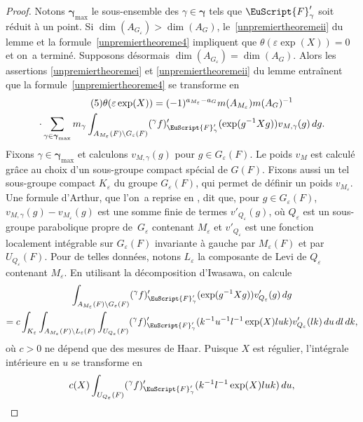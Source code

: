 \documentclass[JEP,XML,SOM,Unicode,francais]{cedram}
\let\mathcal \EuScript
\let\epsilon\varepsilon
\newcommand{\cF}{\mathcal{F}}
\theoremstyle{plain}
\theoremstyle{definition}
\begin{document}
\begin{proof}
Notons $\boldsymbol{\gamma}_{\max}$ le sous-ensemble des $\gamma\in \boldsymbol{\gamma}$ tels que $\cF'_{\gamma}$ soit réduit à un point. Si $\dim(A_{G_{\epsilon}})\!>\!\dim(A_{G})$, le~\eqref{unpremiertheoremeii} du lemme et la formule~\eqref{unpremiertheoreme4} impliquent que \hbox{$\theta(\epsilon \exp(X))\!=\!0$} et on~a terminé. Supposons désormais $\dim(A_{G_{\epsilon}})=\dim(A_{G})$. Alors les assertions \eqref{unpremiertheoremei} et \eqref{unpremiertheoremeii} du lemme entraînent que la formule~\eqref{unpremiertheoreme4} se transforme en
\begin{multline*}\tag{5}\label{unpremiertheoreme5}
\theta(\epsilon \exp(X))=(-1)^{a_{M_{\epsilon}}-a_{G}}m(A_{M_{\epsilon}})m(A_{G})^{-1}\\
\cdot\sum_{\gamma\in \boldsymbol{\gamma}_{\max}}m_{\gamma}
\int_{A_{M_{\epsilon}}(F)\backslash G_{\epsilon}(F)}(^{\gamma}f)'_{\cF'_{\gamma}}(\exp(g^{-1}X g))v_{M,\gamma} (g)\,dg.
\end{multline*}
Fixons $\gamma\in \boldsymbol{\gamma}_{\max}$ et calculons $v_{M,\gamma}(g)$ pour $g\in G_{\epsilon}(F)$. Le poids $v_{M}$ est calculé grâce au choix d'un sous-groupe compact spécial de $G(F)$. Fixons aussi un tel sous-groupe compact $K_{\epsilon}$ du groupe $G_{\epsilon}(F)$, qui permet de définir un poids $v_{M_{\epsilon}}$. Une formule d'Arthur, que l'on~a reprise en \cite[Lem.\,3.3]{W1}, dit que, pour $g\in G_{\epsilon}(F)$, $v_{M,\gamma}(g)-v_{M_{\epsilon}}(g)$ est une somme finie de termes $v'_{Q_{\epsilon}}(g)$, où $Q_{\epsilon}$ est un sous-groupe parabolique propre de~$G_{\epsilon}$ contenant $M_{\epsilon}$ et $v'_{Q_{\epsilon}}$ est une fonction localement intégrable sur $G_{\epsilon}(F)$ invariante à gauche par $M_{\epsilon}(F)$ et par $U_{Q_{\epsilon}}(F)$. Pour de telles données, notons $L_{\epsilon}$ la composante de Levi de $Q_{\epsilon}$ contenant $M_{\epsilon}$. En utilisant la décomposition d'Iwasawa, on calcule
\begin{multline*}
\int_{A_{M_{\epsilon}}(F)\backslash G_{\epsilon}(F)}(^{\gamma}f)'_{\cF'_{\gamma}}(\exp(g^{-1}X g))v_{Q_{\epsilon}}' (g)\,dg\\
=c\int_{K_{\epsilon}}\int_{A_{M_{\epsilon}}(F)\backslash L_{\epsilon}(F)}\int_{U_{Q_{\epsilon}}(F)}(^{\gamma}f)'_{\cF'_{\gamma}}(k^{-1}u^{-1}l^{-1}\exp(X)luk)v'_{Q_{\epsilon}}(lk)\,du\,dl\,dk,
\end{multline*}
où $c>0$ ne dépend que des mesures de Haar. Puisque $X$ est régulier, l'intégrale intérieure en $u$ se transforme en
\[
c(X)\int_{U_{Q_{\epsilon}}(F)}(^{\gamma}f)'_{\cF'_{\gamma}}(k^{-1}l^{-1}\exp(X)luk)\, du,
\]
\end{proof}
\end{document}
